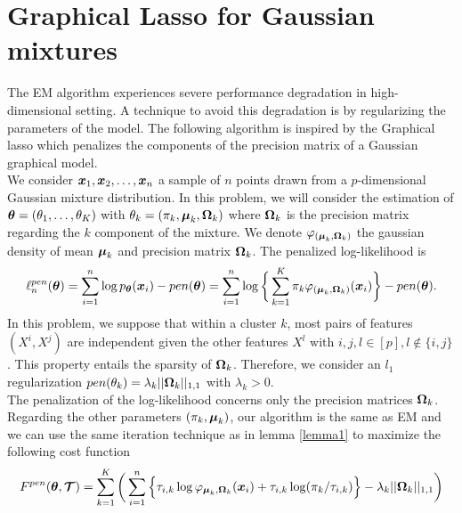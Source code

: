 \section{Graphical Lasso for Gaussian mixtures}

The EM algorithm experiences severe performance degradation in high-dimensional setting. A technique to avoid this degradation is by regularizing the parameters of the model. The following algorithm is inspired by the Graphical lasso \citep{glasso07} \citep{banerjee} which penalizes the components of the precision matrix of a Gaussian graphical model.\\

We consider $\boldsymbol x_1,\boldsymbol x_2,\dots,\boldsymbol x_n$ a sample of $n$ points drawn from a $p$-dimensional Gaussian mixture distribution. In this problem, we will consider the estimation of ${\boldsymbol\theta}=(\theta_1,\dots,\theta_K)$ with $\theta_k=(\pi_k, \boldsymbol\mu_k, \boldsymbol\Omega_k)$ where $\boldsymbol\Omega_k$ is the precision matrix regarding the $k$ component of the mixture. We denote $\varphi_{(\boldsymbol\mu_{k},\boldsymbol\Omega_{k})}$ the gaussian density of mean $\boldsymbol\mu_k$ and precision matrix $\boldsymbol\Omega_k$. The penalized log-likelihood is
\begin{equation}\label{pen-log-likelihood}
\ell_n^{pen}({\boldsymbol\theta})=\sum_{i=1}^{n}\log p_{{\boldsymbol\theta}}(\boldsymbol x_i)-pen({\boldsymbol\theta})= \sum_{i=1}^{n}\log \bigg\{ \sum_{k=1}^K\pi_k\varphi_{(\boldsymbol\mu_{k},\boldsymbol\Omega_{k})}(\boldsymbol x_i)\bigg\} -pen({\boldsymbol\theta}).
\end{equation}
In this problem, we suppose that within a cluster $k$, most pairs of features $(X^i,X^j)$ are independent given the other features $X^l \text{ with } i,j,l\in[p], l\notin\{i,j \}$. This property entails the sparsity of $\boldsymbol\Omega_k$. 
Therefore, we consider an $l_1$ regularization $pen(\theta_k)=\lambda_k||\boldsymbol\Omega_k||_{1,1}$ with $\lambda_k>0$.\\

The penalization of the log-likelihood concerns only the precision matrices $\boldsymbol\Omega_k$. Regarding the other parameters $(\pi_k, \boldsymbol\mu_k)$, our algorithm is the same as EM and we can use the same iteration technique as in lemma \ref{lemma1} to maximize the following cost function
\begin{equation}
\label{cost_fun_pen}
F^{pen}({\boldsymbol\theta},\boldsymbol{\mathcal T})  = \sum_{k=1}^K \bigg(\sum_{i=1}^{n} \Big\{\tau_{i,k}\log\varphi_{\boldsymbol\mu_{k},\boldsymbol\Omega_{k}}(\boldsymbol x_i)+\tau_{i,k}
    \log(\pi_k/\tau_{i,k})\Big\}-\lambda_k||\boldsymbol\Omega_k||_{1,1}\bigg)
\end{equation}


